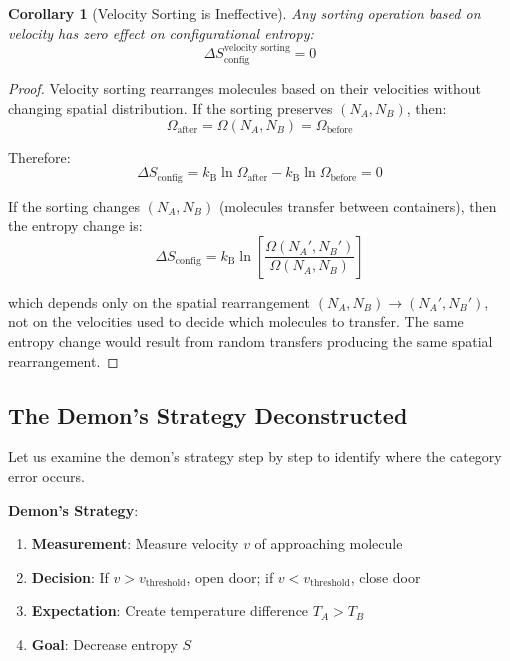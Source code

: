 \documentclass[10pt,twocolumn,letterpaper]{article}
\newtheorem{corollary}[theorem]{Corollary}
\theoremstyle{definition}
\theoremstyle{remark}
\newcommand{\kb}{k_\text{B}}
\newcommand{\Om}{\Omega}
\begin{document}
\begin{corollary}[Velocity Sorting is Ineffective]
\label{cor:velocity_sorting_ineffective_formal}
Any sorting operation based on velocity has zero effect on configurational entropy:
\begin{equation}
\Delta S_{\text{config}}^{\text{velocity sorting}} = 0
\end{equation}
\end{corollary}

\begin{proof}
Velocity sorting rearranges molecules based on their velocities without changing spatial distribution. If the sorting preserves $(N_A, N_B)$, then:
\begin{equation}
\Om_{\text{after}} = \Om(N_A, N_B) = \Om_{\text{before}}
\end{equation}

Therefore:
\begin{equation}
\Delta S_{\text{config}} = \kb \ln \Om_{\text{after}} - \kb \ln \Om_{\text{before}} = 0
\end{equation}

If the sorting changes $(N_A, N_B)$ (molecules transfer between containers), then the entropy change is:
\begin{equation}
\Delta S_{\text{config}} = \kb \ln\left[\frac{\Om(N_A', N_B')}{\Om(N_A, N_B)}\right]
\end{equation}

which depends only on the spatial rearrangement $(N_A, N_B) \to (N_A', N_B')$, not on the velocities used to decide which molecules to transfer. The same entropy change would result from random transfers producing the same spatial rearrangement.
\end{proof}

\subsection{The Demon's Strategy Deconstructed}

Let us examine the demon's strategy step by step to identify where the category error occurs.

\textbf{Demon's Strategy}:
\begin{enumerate}
\item \textbf{Measurement}: Measure velocity $v$ of approaching molecule
\item \textbf{Decision}: If $v > v_{\text{threshold}}$, open door; if $v < v_{\text{threshold}}$, close door
\item \textbf{Expectation}: Create temperature difference $T_A > T_B$
\item \textbf{Goal}: Decrease entropy $S$
\end{enumerate}
\end{document}
